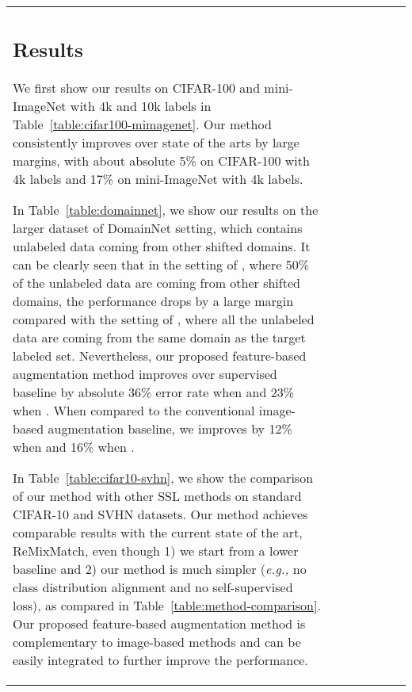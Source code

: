 \documentclass[runningheads]{llncs}
\begin{document}
\begin{table*}[t]
{\begin{tabular}{@{\extracolsep{4pt}}lcccccc@{}}
{\subsection{Results}\label{section:results}

We first show our results on CIFAR-100 and mini-ImageNet with 4k and 10k labels in Table~\ref{table:cifar100-mimagenet}.
Our method consistently improves over state of the arts by large margins, with about absolute 5\% on CIFAR-100 with 4k labels and 17\% on mini-ImageNet with 4k labels.

In Table~\ref{table:domainnet}, we show our results on the larger dataset of DomainNet setting, which contains unlabeled data coming from other shifted domains.
It can be clearly seen that in the setting of , where 50\% of the unlabeled data are coming from other shifted domains, the performance drops by a large margin compared with the setting of , where all the unlabeled data are coming from the same domain as the target labeled set.
Nevertheless, our proposed feature-based augmentation method improves over supervised baseline by absolute 36\% error rate when  and 23\% when .
When compared to the conventional image-based augmentation baseline, we improves by 12\% when  and 16\% when .

In Table~\ref{table:cifar10-svhn}, we show the comparison of our method with other SSL methods on standard CIFAR-10 and SVHN datasets.
Our method achieves comparable results with the current state of the art, ReMixMatch, even though 1) we start from a lower baseline and 2) our method is much simpler (\textit{e.g.,} no class distribution alignment and no self-supervised loss), as compared in Table~\ref{table:method-comparison}.
Our proposed feature-based augmentation method is complementary to image-based methods and can be easily integrated to further improve the performance.

}
\end{tabular}}
\end{table*}
\end{document}
